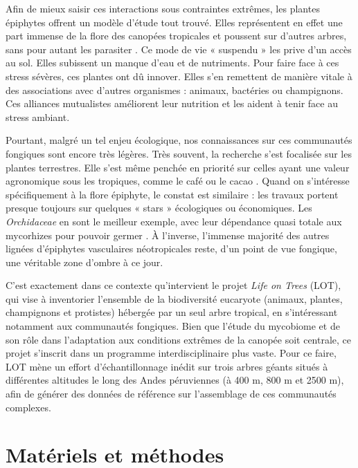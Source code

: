 \documentclass[alpha-refs,twocolumn]{wiley-article}
\begin{document}
Afin de mieux saisir ces interactions sous contraintes extrêmes, les plantes épiphytes offrent un modèle d'étude tout trouvé. Elles représentent en effet une part immense de la flore des canopées tropicales et poussent sur d'autres arbres, sans pour autant les parasiter \citep{zotz_plants_2016}. Ce mode de vie « suspendu » les prive d'un accès au sol. Elles subissent un manque d'eau et de nutriments. Pour faire face à ces stress sévères, ces plantes ont dû innover. Elles s'en remettent de manière vitale à des associations avec d'autres organismes : animaux, bactéries ou champignons. Ces alliances mutualistes améliorent leur nutrition et les aident à tenir face au stress ambiant.

Pourtant, malgré un tel enjeu écologique, nos connaissances sur ces communautés fongiques sont encore très légères. Très souvent, la recherche s'est focalisée sur les plantes terrestres. Elle s'est même penchée en priorité sur celles ayant une valeur agronomique sous les tropiques, comme le café ou le cacao \citep{vega_fungal_2008}. Quand on s’intéresse spécifiquement à la flore épiphyte, le constat est similaire : les travaux portent presque toujours sur quelques « stars » écologiques ou économiques. Les \textit{Orchidaceae} en sont le meilleur exemple, avec leur dépendance quasi totale aux mycorhizes pour pouvoir germer \citep{dearnaley_orchid_2012}. À l'inverse, l'immense majorité des autres lignées d'épiphytes vasculaires néotropicales reste, d'un point de vue fongique, une véritable zone d'ombre à ce jour.


C'est exactement dans ce contexte qu'intervient le projet \textit{Life on Trees} (LOT), qui vise à inventorier l'ensemble de la biodiversité eucaryote (animaux, plantes, champignons et protistes) hébergée par un seul arbre tropical, en s'intéressant notamment aux communautés fongiques. Bien que l'étude du mycobiome et de son rôle dans l'adaptation aux conditions extrêmes de la canopée soit centrale, ce projet s'inscrit dans un programme interdisciplinaire plus vaste. Pour ce faire, LOT mène un effort d'échantillonnage inédit sur trois arbres géants situés à différentes altitudes le long des Andes péruviennes (à 400 m, 800 m et 2500 m), afin de générer des données de référence sur l'assemblage de ces communautés complexes.




\section{Matériels et méthodes}
\end{document}
